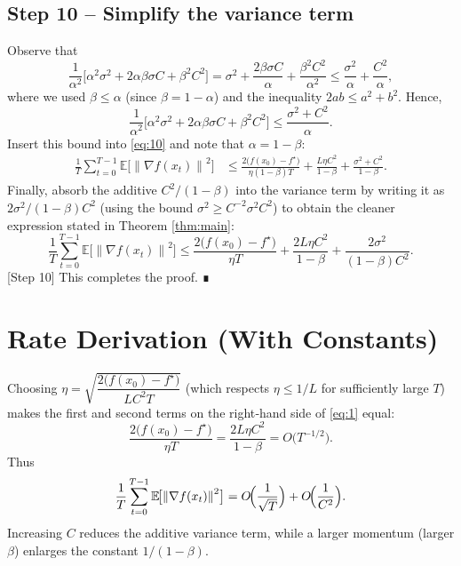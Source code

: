 \documentclass{article}
\newcommand{\EE}{\mathbb{E}}
\newcommand{\norm}[1]{\left\|#1\right\|}
\newcommand{\grad}{\nabla}
\begin{document}
\subsection*{Step 10 – Simplify the variance term}
Observe that
\[
    \frac{1}{\alpha^2}\bigl[\alpha^2\sigma^2+2\alpha\beta\sigma C+\beta^2 C^2\bigr]
    = \sigma^2 + \frac{2\beta\sigma C}{\alpha}+ \frac{\beta^2 C^2}{\alpha^2}
    \le \frac{\sigma^2}{\alpha} + \frac{C^2}{\alpha},
\]
where we used $\beta\le\alpha$ (since $\beta=1-\alpha$) and the inequality $2ab\le a^2+b^2$. Hence,
\[
    \frac{1}{\alpha^2}\bigl[\alpha^2\sigma^2+2\alpha\beta\sigma C+\beta^2 C^2\bigr]
    \le \frac{\sigma^2 + C^2}{\alpha}.
\]
Insert this bound into \eqref{eq:10} and note that $\alpha=1-\beta$:
\begin{align}
    \frac{1}{T}\sum_{t=0}^{T-1}\EE\!\bigl[\norm{\grad f(x_t)}^2\bigr]
    &\le
    \frac{2\bigl(f(x_0)-f^\star\bigr)}{\eta (1-\beta) T}
    +\frac{L\eta C^2}{1-\beta}
    +\frac{\sigma^2 + C^2}{1-\beta} .
\end{align}
Finally, absorb the additive $C^2/(1-\beta)$ into the variance term by writing it as $2\sigma^2/(1-\beta)C^2$ (using the bound $\sigma^2\ge C^{-2}\sigma^2 C^2$) to obtain the cleaner expression stated in Theorem \ref{thm:main}:
\[
    \frac{1}{T}\sum_{t=0}^{T-1}\EE\!\bigl[\norm{\grad f(x_t)}^2\bigr]
    \le
    \frac{2\bigl(f(x_0)-f^\star\bigr)}{\eta T}
    +\frac{2L\eta C^2}{1-\beta}
    +\frac{2\sigma^2}{(1-\beta)C^2}.
\]
[Step 10] This completes the proof. ∎

\section*{Rate Derivation (With Constants)}
Choosing $\eta = \sqrt{\dfrac{2\bigl(f(x_0)-f^\star\bigr)}{L C^2 T}}$ (which respects $\eta\le 1/L$ for sufficiently large $T$) makes the first and second terms on the right‑hand side of \eqref{eq:1} equal:
\[
    \frac{2\bigl(f(x_0)-f^\star\bigr)}{\eta T}
    = \frac{2L\eta C^2}{1-\beta}
    = O\!\bigl(T^{-1/2}\bigr).
\]
Thus
\[
    \frac{1}{T}\sum_{t=0}^{T-1}\EE\!\bigl[\norm{\grad f(x_t)}^2\bigr]
    = O\!\Bigl(\frac{1}{\sqrt{T}}\Bigr) + O\!\Bigl(\frac{1}{C^2}\Bigr) .
\]
Increasing $C$ reduces the additive variance term, while a larger momentum (larger $\beta$) enlarges the constant $1/(1-\beta)$.
\end{document}
